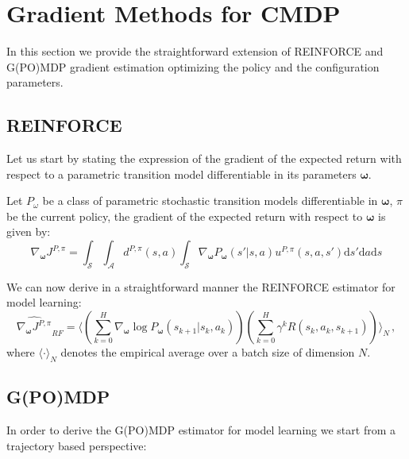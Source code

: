 \chapter{Gradient Methods for CMDP}
\label{gradient_cmdp}
\thispagestyle{empty}
In this section we provide the straightforward extension of REINFORCE and G(PO)MDP gradient estimation optimizing the policy and the configuration parameters.
\section{REINFORCE}
Let us start by stating the expression of the gradient of the expected return with respect to a parametric transition model differentiable in its parameters $\boldsymbol{\omega}$.
\begin{theorem} Let $P_\omega$ be a class of parametric stochastic transition models differentiable in $\boldsymbol{\omega}$, $\pi$ be the current policy, the gradient of the expected return with respect to $\boldsymbol{\omega}$ is given by:
$$
\nabla_{\boldsymbol{\omega}}J^{P,\pi} = \int_{\mathcal{S}}\int_{\mathcal{A}} d^{P,\pi}(s,a) \int_{\mathcal{S}} \nabla_{\boldsymbol{\omega}}P_{\boldsymbol{\omega}}(s'|s,a)u^{P,\pi}(s,a,s') \mathrm{d}s' \mathrm{d}a \mathrm{d}s
$$
	
\end{theorem}

We can now derive in a straightforward manner the REINFORCE estimator for model learning:
\begin{equation}
\widehat{\nabla_{\boldsymbol{\omega}} J^{P,\pi}}_{RF} = \langle \left(\sum_{k=0}^H \nabla_{\bm{\omega}} \log P_{\boldsymbol{\omega}}(s_{k+1} |s_k, a_k) \right) \left( \sum_{k=0}^H \gamma^k R(s_k,a_k, s_{k+1}) \right) \rangle_N \, ,
\end{equation}
where $\langle \cdot \rangle_N$ denotes the empirical average over a batch size of dimension $N$.

\section{G(PO)MDP}
\label{gpomdp_cmdp}
In order to derive the G(PO)MDP estimator for model learning we start from a trajectory based perspective:

